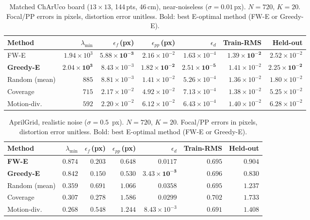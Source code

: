 \documentclass[11pt]{article}
\begin{document}
\begin{table}[ht]
\centering
\setlength{\tabcolsep}{4pt}
\caption{Matched ChArUco board ($13{\times}13$, 144\,pts, 46\,cm), near-noiseless ($\sigma{=}0.01$\,px). $N{=}720$, $K{=}20$.
Focal/PP errors in pixels, distortion error unitless. Bold: best E-optimal method (FW-E or Greedy-E).}
\label{tab:charuco_noiseless}
\begin{tabular}{lrrrrrr}
\toprule
Method & $\lambda_{\min}$ & $\epsilon_f$\,(px) & $\epsilon_{pp}$\,(px) & $\epsilon_d$ & Train-RMS & Held-out \\
\midrule
FW-E              & $1.94\!\times\!10^{3}$ & $\mathbf{5.88\!\times\!10^{-3}}$ & $2.16\!\times\!10^{-2}$ & $1.63\!\times\!10^{-4}$ & $\mathbf{1.39\!\times\!10^{-2}}$ & $2.52\!\times\!10^{-2}$ \\
\textbf{Greedy-E} & $\mathbf{2.04\!\times\!10^{3}}$ & $8.43\!\times\!10^{-3}$ & $\mathbf{1.82\!\times\!10^{-2}}$ & $\mathbf{2.51\!\times\!10^{-5}}$ & $1.41\!\times\!10^{-2}$ & $\mathbf{2.25\!\times\!10^{-2}}$ \\
Random (mean)     & $885$ & $8.81\!\times\!10^{-3}$ & $1.41\!\times\!10^{-2}$ & $5.26\!\times\!10^{-4}$ & $1.36\!\times\!10^{-2}$ & $1.80\!\times\!10^{-2}$ \\
Coverage          & $715$ & $2.17\!\times\!10^{-2}$ & $4.92\!\times\!10^{-2}$ & $7.13\!\times\!10^{-4}$ & $1.38\!\times\!10^{-2}$ & $5.25\!\times\!10^{-2}$ \\
Motion-div.       & $592$ & $2.20\!\times\!10^{-2}$ & $6.12\!\times\!10^{-2}$ & $6.43\!\times\!10^{-4}$ & $1.40\!\times\!10^{-2}$ & $6.28\!\times\!10^{-2}$ \\
\bottomrule
\end{tabular}
\end{table}

\begin{table}[ht]
\centering
\setlength{\tabcolsep}{4pt}
\caption{AprilGrid, realistic noise ($\sigma{=}0.5$~px). $N{=}720$, $K{=}20$.
Focal/PP errors in pixels, distortion error unitless. Bold: best E-optimal method (FW-E or Greedy-E).}
\label{tab:aprilgrid_sigma05}
\begin{tabular}{lrrrrrr}
\toprule
Method & $\lambda_{\min}$ & $\epsilon_f$\,(px) & $\epsilon_{pp}$\,(px) & $\epsilon_d$ & Train-RMS & Held-out \\
\midrule
\textbf{FW-E}     & $\mathbf{0.874}$ & $0.203$ & $0.648$ & $0.0117$ & $\mathbf{0.695}$ & $0.904$ \\
\textbf{Greedy-E} & $0.842$ & $\mathbf{0.150}$ & $\mathbf{0.530}$ & $\mathbf{3.43\!\times\!10^{-3}}$ & $0.696$ & $\mathbf{0.830}$ \\
Random (mean)     & $0.359$ & $0.691$ & $1.066$ & $0.0358$ & $0.695$ & $1.237$ \\
Coverage          & $0.307$ & $0.278$ & $1.586$ & $0.0299$ & $0.702$ & $1.733$ \\
Motion-div.       & $0.268$ & $0.548$ & $1.244$ & $8.43\!\times\!10^{-3}$ & $0.691$ & $1.408$ \\
\bottomrule
\end{tabular}
\end{table}
\end{document}
